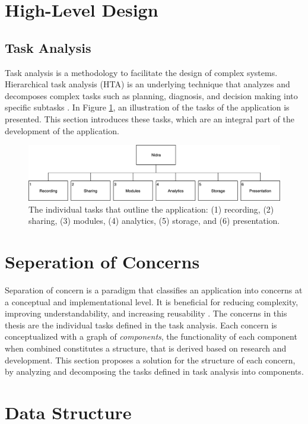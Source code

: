 

\section{High-Level Design}

\subsection{Task Analysis}
Task analysis is a methodology to facilitate the design of complex systems. Hierarchical task analysis (HTA) is an underlying technique that analyzes and decomposes complex tasks such as planning, diagnosis, and decision making into specific subtasks \cite{ta}. In Figure \ref{fig:hta_overview}, an illustration of the tasks of the application is presented. This section introduces these tasks, which are an integral part of the development of the application.

\begin{figure}
    \centering
    \includegraphics[scale=0.23]{images/TA.png}
    \caption{The individual tasks that outline the application: (1) recording, (2) sharing, (3) modules, (4) analytics, (5) storage, and (6) presentation.}
    \label{fig:hta_overview}
\end{figure}



\section{Seperation of Concerns}\label{design_soc}
Separation of concern is a paradigm that classifies an application into concerns at a conceptual and implementational level. It is beneficial for reducing complexity, improving understandability, and increasing reusability \cite{soc}. The concerns in this thesis are the individual tasks defined in the task analysis. Each concern is conceptualized with a graph of \textit{components}, the functionality of each component when combined constitutes a {structure}, that is derived based on research and development. This section proposes a solution for the structure of each concern, by analyzing and decomposing the tasks defined in task analysis into components.



\section{Data Structure}


